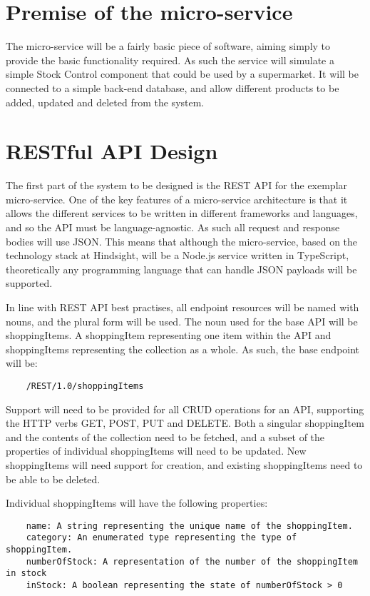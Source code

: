 \section{Premise of the micro-service}
The micro-service will be a fairly basic piece of software, aiming simply to provide the basic functionality required. As such the service will simulate a simple Stock Control component that could be used by a supermarket. It will be connected to a simple back-end database, and allow different products to be added, updated and deleted from the system. 

\section{RESTful API Design}
The first part of the system to be designed is the REST API for the exemplar micro-service. One of the key features of a micro-service architecture is that it allows the different services to be written in different frameworks and languages, and so the API must be language-agnostic. As such all request and response bodies will use JSON. This means that although the micro-service, based on the technology stack at Hindsight, will be a Node.js service written in TypeScript, theoretically any programming language that can handle JSON payloads will be supported.

In line with REST API best practises, all endpoint resources will be named with nouns, and the plural form will be used. The noun used for the base API will be shoppingItems. A shoppingItem representing one item within the API and shoppingItems representing the collection as a whole. 
As such, the base endpoint will be:
\begin{verbatim}
    /REST/1.0/shoppingItems
\end{verbatim}

Support will need to be provided for all CRUD operations for an API, supporting the HTTP verbs GET, POST, PUT and DELETE. Both a singular shoppingItem and the contents of the collection need to be fetched, and a subset of the properties of individual shoppingItems will need to be updated. New shoppingItems will need support for creation, and existing shoppingItems need to be able to be deleted.

Individual shoppingItems will have the following properties:
\begin{verbatim}
    name: A string representing the unique name of the shoppingItem.
    category: An enumerated type representing the type of shoppingItem.
    numberOfStock: A representation of the number of the shoppingItem in stock
    inStock: A boolean representing the state of numberOfStock > 0
\end{verbatim}

